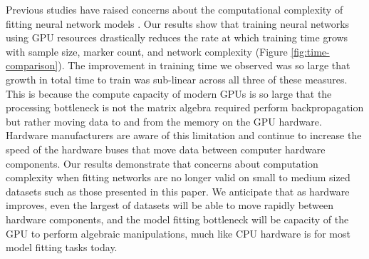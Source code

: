 Previous studies have raised concerns about the computational complexity of fitting
neural network models \citep{heslot2012,gonzalez-recio2014}. Our results show
that training neural networks using GPU resources drastically
reduces the rate at which training time grows with sample size, marker count,
and network complexity (Figure \ref{fig:time-comparison}). The improvement in 
training time we observed was so large that growth in total time to train was sub-linear
across all three of these measures. This is because the compute capacity 
of modern GPUs is so large that the processing bottleneck is not the matrix algebra 
required perform backpropagation but rather moving data to and from the memory on 
the GPU hardware. Hardware manufacturers are aware of this limitation 
and continue to increase the speed of the hardware 
buses that move data between computer hardware components. Our results
demonstrate that concerns about computation complexity when fitting 
networks are no longer valid on small to medium sized datasets such as 
those presented in this paper. We anticipate that as hardware improves, 
even the largest of datasets will be able to move rapidly between hardware components, 
and the model fitting bottleneck will be capacity of the
GPU to perform algebraic manipulations, much like CPU hardware is for most 
model fitting tasks today.

